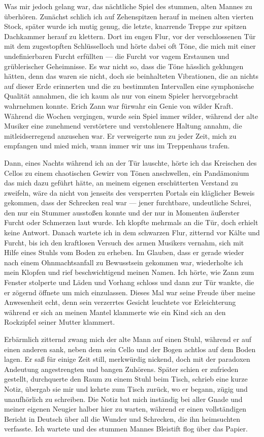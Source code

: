 \documentclass[a4paper]{memoir}
\begin{document}
Was mir jedoch gelang war, das nächtliche Spiel des stummen, alten Mannes zu überhören. Zunächst schlich ich auf Zehenspitzen herauf in meinen alten vierten Stock, später wurde ich mutig genug, die letzte, knarrende Treppe zur spitzen Dachkammer herauf zu klettern. Dort im engen Flur, vor der verschlossenen Tür mit dem zugestopften Schlüsselloch und hörte dabei oft Töne, die mich mit einer undefinierbaren Furcht erfüllten --- die Furcht vor vagem Erstaunen und grüblerischer Geheimnisse. Es war nicht so, dass die Töne hässlich geklungen hätten, denn das waren sie nicht, doch sie beinhalteten Vibrationen, die an nichts auf dieser Erde erinnerten und die zu bestimmten Intervallen eine symphonische Qualität annahmen, die ich kaum als nur von einem Spieler hervorgebracht wahrnehmen konnte. Erich Zann war fürwahr ein Genie von wilder Kraft. Während die Wochen vergingen, wurde sein Spiel immer wilder, während der alte Musiker eine zunehmend verstörtere und verstohlenere Haltung annahm, die mitleidserregend anzusehen war. Er verweigerte nun zu jeder Zeit, mich zu empfangen und mied mich, wann immer wir uns im Treppenhaus trafen.

Dann, eines Nachts während ich an der Tür lauschte, hörte ich das Kreischen des Cellos zu einem chaotischen Gewirr von Tönen anschwellen, ein Pandämonium das mich dazu geführt hätte, an meinem eigenen erschütterten Verstand zu zweifeln, wäre da nicht von jenseits des versperrten Portals ein kläglicher Beweis gekommen, dass der Schrecken real war --- jener furchtbare, undeutliche Schrei, den nur ein Stummer ausstoßen konnte und der nur in Momenten äußerster Furcht oder Schmerzen laut wurde. Ich klopfte mehrmals an die Tür, doch erhielt keine Antwort. Danach wartete ich in dem schwarzen Flur, zitternd vor Kälte und Furcht, bis ich den kraftlosen Versuch des armen Musikers vernahm, sich mit Hilfe eines Stuhls vom Boden zu erheben. Im Glauben, dass er gerade wieder nach einem Ohnmachtsanfall zu Bewusstsein gekommen war, wiederholte ich mein Klopfen und rief beschwichtigend meinen Namen. Ich hörte, wie Zann zum Fenster stolperte und Läden und Vorhang schloss und dann zur Tür wankte, die er zögernd öffnete um mich einzulassen. Dieses Mal war seine Freude über meine Anwesenheit echt, denn sein verzerrtes Gesicht leuchtete vor Erleichterung während er sich an meinen Mantel klammerte wie ein Kind sich an den Rockzipfel seiner Mutter klammert.

Erbärmlich zitternd zwang mich der alte Mann auf einen Stuhl, während er auf einen anderen sank, neben dem sein Cello und der Bogen achtlos auf dem Boden lagen. Er saß für einige Zeit still, merkwürdig nickend, doch mit der paradoxen Andeutung angestrengten und bangen Zuhörens. Später schien er zufrieden gestellt, durchquerte den Raum zu einem Stuhl beim Tisch, schrieb eine kurze Notiz, übergab sie mir und kehrte zum Tisch zurück, wo er begann, zügig und unaufhörlich zu schreiben. Die Notiz bat mich inständig bei aller Gnade und meiner eigenen Neugier halber hier zu warten, während er einen vollständigen Bericht in Deutsch über all die Wunder und Schrecken, die ihn heimsuchten verfasste. Ich wartete und des stummen Mannes Bleistift flog über das Papier.
\end{document}
